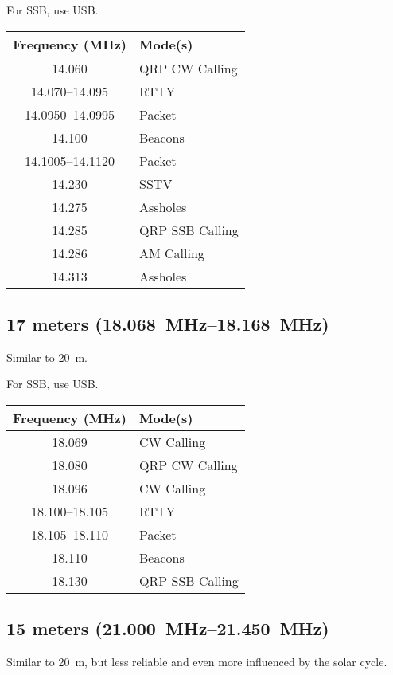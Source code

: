 \documentclass[11pt, onecolumn, table]{article}
\begin{document}
For SSB, use USB.
\begin{center}
  \begin{tabular}{S l}
    {Frequency (\si{\MHz})}		& Mode(s)			\\
    \midrule
    \num{14.060}				& QRP CW Calling	\\
    \numrange{14.070}{14.095}	& RTTY				\\
    \numrange{14.0950}{14.0995}	& Packet			\\
    \num{14.100}				& Beacons			\\
    \numrange{14.1005}{14.1120}	& Packet			\\
    \num{14.230}				& SSTV				\\
    \num{14.275}				& Assholes			\\
    \num{14.285}				& QRP SSB Calling	\\
    \num{14.286}				& AM Calling		\\
    \num{14.313}				& Assholes			\\
  \end{tabular}
\end{center}


\newpage
\subsection{17 meters (\SIrange{18.068}{18.168}{\MHz})}
Similar to \SI{20}{m}.

For SSB, use USB.
\begin{center}
  \begin{tabular}{S l}
    {Frequency (\si{\MHz})}			& Mode(s)			\\
    \midrule
    \num{18.069}					& CW Calling		\\
    \num{18.080}					& QRP CW Calling	\\
    \num{18.096}					& CW Calling		\\
    \numrange{18.100}{18.105}		& RTTY				\\
    \numrange{18.105}{18.110}		& Packet			\\
    \num{18.110}					& Beacons			\\
    \num{18.130}					& QRP SSB Calling	\\
  \end{tabular}
\end{center}


\subsection{15 meters (\SIrange{21.000}{21.450}{\MHz})}
Similar to \SI{20}{m}, but less reliable and even more influenced
by the solar cycle.
\end{document}
